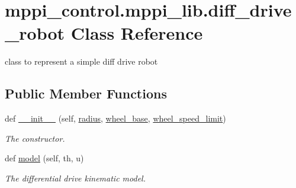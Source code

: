 \hypertarget{classmppi__control_1_1mppi__lib_1_1diff__drive__robot}{}\section{mppi\+\_\+control.\+mppi\+\_\+lib.\+diff\+\_\+drive\+\_\+robot Class Reference}
\label{classmppi__control_1_1mppi__lib_1_1diff__drive__robot}


class to represent a simple diff drive robot  


\subsection*{Public Member Functions}
\begin{DoxyCompactItemize}
\item 
def \hyperlink{classmppi__control_1_1mppi__lib_1_1diff__drive__robot_a47e8aa290b90853fc9f887e71e0ab605}{\+\_\+\+\_\+init\+\_\+\+\_\+} (self, \hyperlink{classmppi__control_1_1mppi__lib_1_1diff__drive__robot_ad5fc7c9c87985d383158121fb2705bcc}{radius}, \hyperlink{classmppi__control_1_1mppi__lib_1_1diff__drive__robot_af48eec2a0d6e673a3c19b65aa803cbba}{wheel\+\_\+base}, \hyperlink{classmppi__control_1_1mppi__lib_1_1diff__drive__robot_a6ddb4573599b2d41a59a35fe9e949077}{wheel\+\_\+speed\+\_\+limit})
\begin{DoxyCompactList}\small\item\em The constructor. \end{DoxyCompactList}\item 
def \hyperlink{classmppi__control_1_1mppi__lib_1_1diff__drive__robot_adcb822f7c460f713d5a4fdbb9d811fc8}{model} (self, th, u)
\begin{DoxyCompactList}\small\item\em The differential drive kinematic model. \end{DoxyCompactList}\end{DoxyCompactItemize}
